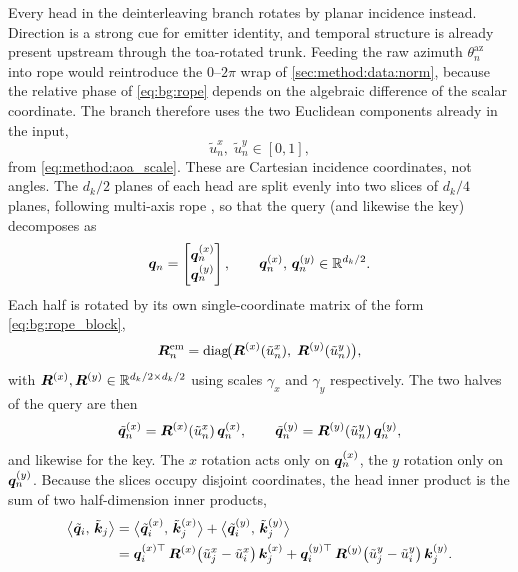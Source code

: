 Every head in the deinterleaving branch rotates by planar incidence instead.
Direction is a strong cue for emitter identity, and temporal structure is already present upstream through the \gls{toa}-rotated trunk.
Feeding the raw azimuth $\theta^{\mathrm{az}}_n$ into \gls{rope} would reintroduce the $0$--$2\pi$ wrap of \cref{sec:method:data:norm}, because the relative phase of \cref{eq:bg:rope} depends on the algebraic difference of the scalar coordinate.
The branch therefore uses the two Euclidean components already in the input,
\begin{equation}\label{eq:method:incidence_coords}
  \tilde{u}^{x}_n,\; \tilde{u}^{y}_n \in [0,1],
\end{equation}
from \cref{eq:method:aoa_scale}.
These are Cartesian incidence coordinates, not angles.
The $d_k/2$ planes of each head are split evenly into two slices of $d_k/4$ planes, following multi-axis \gls{rope} \parencite{heo2024ropevit}, so that the query (and likewise the key) decomposes as
\begin{equation}\label{eq:method:rope_split}
  \bm{q}_n
  =
  \begin{bmatrix}
    \bm{q}_n^{(x)} \\
    \bm{q}_n^{(y)}
  \end{bmatrix},
  \qquad
  \bm{q}_n^{(x)},\, \bm{q}_n^{(y)} \in \mathbb{R}^{d_k/2}.
\end{equation}
Each half is rotated by its own single-coordinate matrix of the form \cref{eq:bg:rope_block},
\begin{equation}\label{eq:method:rope_az}
  \bm{R}^{\mathrm{em}}_n
  =
  \operatorname{diag}\!\bigl(
    \bm{R}^{(x)}(\tilde{u}^{x}_n),\;
    \bm{R}^{(y)}(\tilde{u}^{y}_n)
  \bigr),
\end{equation}
with $\bm{R}^{(x)},\bm{R}^{(y)}\in\mathbb{R}^{d_k/2\times d_k/2}$ using scales $\gamma_x$ and $\gamma_y$ respectively.
The two halves of the query are then
\begin{equation}\label{eq:method:rope_az_q}
  \tilde{\bm{q}}_n^{(x)}
  =
  \bm{R}^{(x)}(\tilde{u}^{x}_n)\,\bm{q}_n^{(x)},
  \qquad
  \tilde{\bm{q}}_n^{(y)}
  =
  \bm{R}^{(y)}(\tilde{u}^{y}_n)\,\bm{q}_n^{(y)},
\end{equation}
and likewise for the key.
The $x$ rotation acts only on $\bm{q}_n^{(x)}$, the $y$ rotation only on $\bm{q}_n^{(y)}$.
Because the slices occupy disjoint coordinates, the head inner product is the sum of two half-dimension inner products,
\begin{align}
  \bigl\langle \tilde{\bm{q}}_i,\, \tilde{\bm{k}}_j \bigr\rangle
  &=
  \bigl\langle \tilde{\bm{q}}_i^{(x)},\, \tilde{\bm{k}}_j^{(x)} \bigr\rangle
  +
  \bigl\langle \tilde{\bm{q}}_i^{(y)},\, \tilde{\bm{k}}_j^{(y)} \bigr\rangle
  \nonumber
  \\
  &=
  \bm{q}_i^{(x)\top}\,
  \bm{R}^{(x)}\bigl(\tilde{u}^{x}_j - \tilde{u}^{x}_i\bigr)\,
  \bm{k}_j^{(x)}
  +
  \bm{q}_i^{(y)\top}\,
  \bm{R}^{(y)}\bigl(\tilde{u}^{y}_j - \tilde{u}^{y}_i\bigr)\,
  \bm{k}_j^{(y)}.
  \label{eq:method:rope_az_logit}
\end{align}
